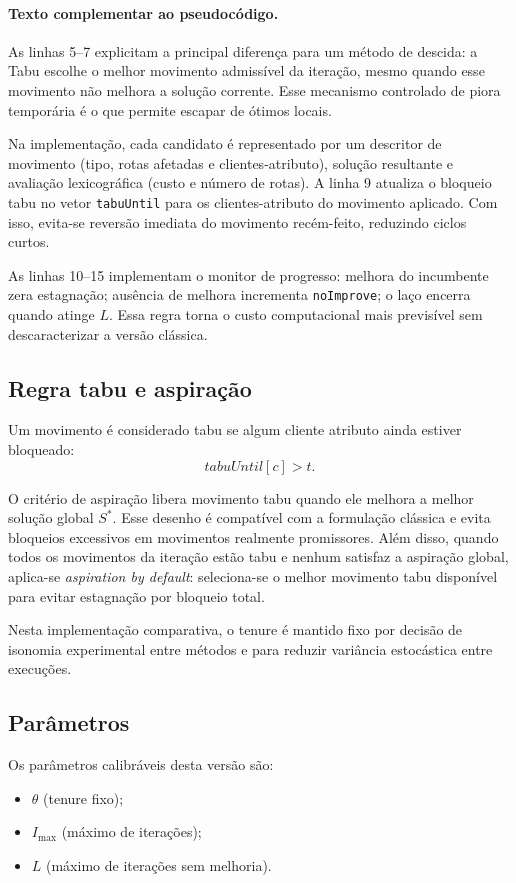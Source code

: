 \paragraph{Texto complementar ao pseudocódigo.}
As linhas 5--7 explicitam a principal diferença para um método de descida: a Tabu escolhe o melhor movimento admissível da iteração, mesmo quando esse movimento não melhora a solução corrente.
Esse mecanismo controlado de piora temporária é o que permite escapar de ótimos locais.

Na implementação, cada candidato é representado por um descritor de movimento (tipo, rotas afetadas e clientes-atributo), solução resultante e avaliação lexicográfica (custo e número de rotas).
A linha 9 atualiza o bloqueio tabu no vetor \texttt{tabuUntil} para os clientes-atributo do movimento aplicado.
Com isso, evita-se reversão imediata do movimento recém-feito, reduzindo ciclos curtos.

As linhas 10--15 implementam o monitor de progresso: melhora do incumbente zera estagnação; ausência de melhora incrementa \texttt{noImprove}; o laço encerra quando atinge $L$.
Essa regra torna o custo computacional mais previsível sem descaracterizar a versão clássica.

\subsection{Regra tabu e aspiração}

Um movimento é considerado tabu se algum cliente atributo ainda estiver bloqueado:
\[
 tabuUntil[c] > t.
\]

O critério de aspiração libera movimento tabu quando ele melhora a melhor solução global $S^*$.
Esse desenho é compatível com a formulação clássica e evita bloqueios excessivos em movimentos realmente promissores.
Além disso, quando todos os movimentos da iteração estão tabu e nenhum satisfaz a aspiração global, aplica-se \emph{aspiration by default}: seleciona-se o melhor movimento tabu disponível para evitar estagnação por bloqueio total.

Nesta implementação comparativa, o tenure é mantido fixo por decisão de isonomia experimental entre métodos e para reduzir variância estocástica entre execuções.

\subsection{Parâmetros}

Os parâmetros calibráveis desta versão são:
\begin{itemize}
  \item $\theta$ (tenure fixo);
  \item $I_{\max}$ (máximo de iterações);
  \item $L$ (máximo de iterações sem melhoria).
\end{itemize}

